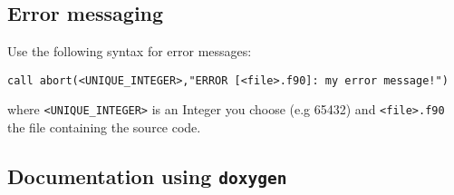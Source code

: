 \documentclass[11pt]{article}
\begin{document}
\subsection*{Error messaging}

Use the following syntax for error messages:
\begin{lstlisting}
call abort(<UNIQUE_INTEGER>,"ERROR [<file>.f90]: my error message!")
\end{lstlisting}
\noindent
where \texttt{<UNIQUE\_INTEGER>} is an Integer you choose (e.g 65432) and \texttt{<file>.f90} the file containing the source code.

\subsection*{Documentation using \texttt{doxygen}}
\end{document}

